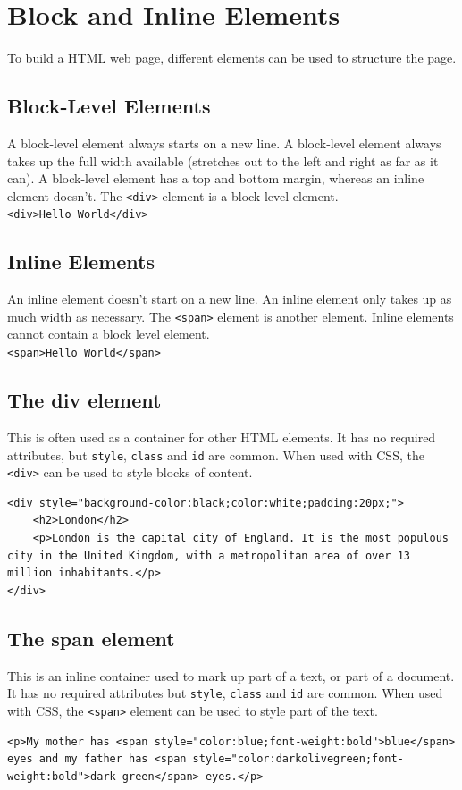 \documentclass{thomasClass}
\begin{document}
\section{Block and Inline Elements}
To build a HTML web page, different elements can be used to structure the page. 
\subsection{Block-Level Elements}
A block-level element always starts on a new line. A block-level element always takes up the full width available (stretches out to the left and right as far as it can). A block-level element has a top and bottom margin, whereas an inline element doesn't. The \verb|<div>| element is a block-level element.\\
\verb|<div>Hello World</div>|
\subsection{Inline Elements}
An inline element doesn't start on a new line. An inline element only takes up as much width as necessary. The \verb|<span>| element is another element. Inline elements cannot contain a block level element.\\
\verb|<span>Hello World</span>|
\subsection{The div element}
This is often used as a container for other HTML elements. It has no required attributes, but \verb|style|, \verb|class| and \verb|id| are common. When used with CSS, the \verb|<div>| can be used to style blocks of content.
\begin{Verbatim}[breaklines=true, breakanywhere=true]
<div style="background-color:black;color:white;padding:20px;">
    <h2>London</h2>
    <p>London is the capital city of England. It is the most populous city in the United Kingdom, with a metropolitan area of over 13 million inhabitants.</p>
</div>
\end{Verbatim}
\subsection{The span element}
This is an inline container used to mark up part of a text, or part of a document. It has no required attributes but \verb|style|, \verb|class| and \verb|id| are common. When used with CSS, the \verb|<span>| element can be used to style part of the text.
\begin{Verbatim}[breaklines=true, breakanywhere=true]
<p>My mother has <span style="color:blue;font-weight:bold">blue</span> eyes and my father has <span style="color:darkolivegreen;font-weight:bold">dark green</span> eyes.</p>
\end{Verbatim}
\end{document}
